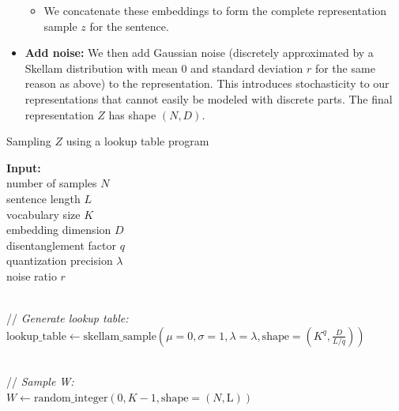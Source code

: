 \documentclass{article}
\begin{document}
\begin{appendices}
\begin{itemize}
\begin{itemize}
        \item We concatenate these embeddings to form the complete representation sample $z$ for the sentence.
    \end{itemize}
    
    \item \textbf{Add noise:}
    We then add Gaussian noise (discretely approximated by a Skellam distribution with mean 0 and standard deviation $r$ for the same reason as above) to the representation. This introduces stochasticity to our representations that cannot easily be modeled with discrete parts. The final representation $Z$ has shape $(N, D)$.
\end{itemize}

\begin{algorithm}
\caption{Sampling $Z$ using a lookup table program}
\label{alg:lookup_table}
\begin{algorithmic}
\item \textbf{Input:}
\\ \hspace{1em} number of samples $N$
\\ \hspace{1em} sentence length $L$
\\ \hspace{1em} vocabulary size $K$
\\ \hspace{1em} embedding dimension $D$
\\ \hspace{1em} disentanglement factor $q$
\\ \hspace{1em} quantization precision $\lambda$
\\ \hspace{1em} noise ratio $r$

\item 
\\ // \textit{Generate lookup table:}
\\ $\text{lookup\_table} \leftarrow \text{skellam\_sample}(\mu=0, \sigma=1, \lambda=\lambda, \text{shape}=(K^q, \frac{D}{L / q}))$

\item 
\\ // \textit{Sample W:}
\\ $W \leftarrow \text{random\_integer}(0, K-1, \text{shape}=(N, \text{L}))$


\end{algorithmic}
\end{algorithm}
\end{appendices}
\end{document}
